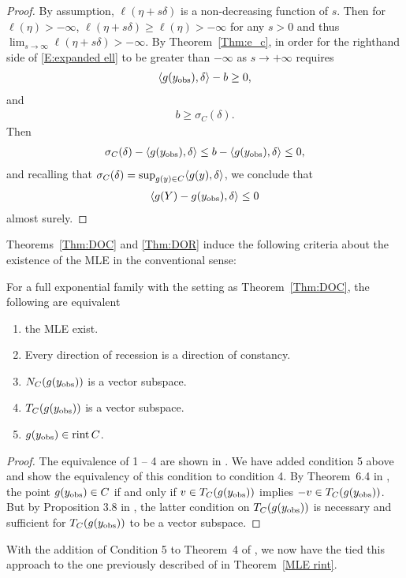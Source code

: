 \begin{proof}
By assumption, $\ell(\eta + s\delta)$ is a non-decreasing function of $s$.  
Then for $\ell(\eta ) > -\infty$, $\ell(\eta + s\delta) \geq \ell(\eta )  > -\infty$
for any $s>0$ and thus $\lim_{s \to \infty} \ell(\eta+s\delta) > -\infty$.
By Theorem~\ref{Thm:e_c}, in order for the righthand side of \eqref{E:expanded ell} 
to be greater than $-\infty$ as $s \to +\infty$ requires
\begin{align*}
	\langle g(y_{\text{obs}}), \delta \rangle - b \geq 0,
\end{align*}
and
\begin{align*}
	b \geq \sigma_C(\delta). %
\end{align*}
Then
\begin{align*}
	\sigma_C(\delta)  - \langle g(y_{\text{obs}}), \delta \rangle \leq b - \langle g(y_{\text{obs}}), \delta \rangle  \leq 0,
\end{align*}
and recalling that $\sigma_C(\delta) = \sup_{g(y) \in C} \langle g(y), \delta \rangle$, 
we conclude that
\begin{align*}
	\langle g(Y) - g(y_{\text{obs}}),\delta  \rangle \leq 0
\end{align*}
almost surely.
\end{proof}

Theorems~\ref{Thm:DOC} and \ref{Thm:DOR} induce the following criteria about the
existence of the MLE in the conventional sense:

\begin{theorem} \label{Thm:MLE existence}
For a full exponential family with the setting as Theorem~\ref{Thm:DOC}, the 
following are equivalent 
\begin{enumerate}
\item the MLE exist.
\item Every direction of recession is a direction of constancy.
\item $N_C(g(y_{\text{obs}}))$ is a vector subspace.
\item $T_C(g(y_{\text{obs}}))$ is a vector subspace.
\item $g(y_{\text{obs}}) \in \operatorname{rint} C$.
\end{enumerate}
\end{theorem}
\begin{proof}
The equivalence of 1 -- 4 are shown in \citep{Geyer:gdor}.  We have added condition 5 above
and show the equivalency of this condition to condition 4.  By Theorem~6.4 in \citep{Rockafellar:1970}, the point $g(y_{\text{obs}}) \in C$ if and only if $v \in T_C(g(y_{\text{obs}}))$ implies
$-v \in T_C(g(y_{\text{obs}}))$.  But by Proposition 3.8 in \citep{Rockafellar}, the latter condition
on  $T_C(g(y_{\text{obs}}))$ is necessary and sufficient for  $T_C(g(y_{\text{obs}}))$ to be a vector subspace.
\end{proof}
With the addition of Condition 5 to Theorem~4 of \citep{Geyer:gdor}, we now have the 
tied this approach to the one previously described of \citep{Barndorff} in Theorem~\ref{MLE rint}.

